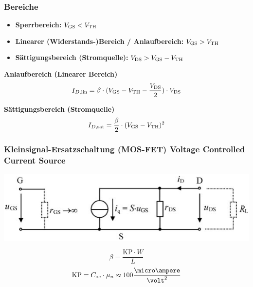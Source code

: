 \subsubsection{Bereiche}

\begin{itemize}
    \item \textbf{Sperrbereich:} $V_{\rm GS} < V_{\rm TH}$ 
    \item \textbf{Linearer (Widerstands-)Bereich / Anlaufbereich:} $V_{\rm GS} > V_{\rm TH}$
    \item \textbf{Sättigungsbereich (Stromquelle):} $V_{\rm DS} > V_{\rm GS} - V_{\rm TH}$
\end{itemize}

\vspace{0.2cm}

\begin{minipage}[t]{0.48\columnwidth}
    \textbf{Anlaufbereich (Linearer Bereich)}
    $$ I_{D,\rm lin} = \beta \cdot ( V_{\rm GS} - V_{\rm TH} - \frac{V_{\rm DS}}{2} ) \cdot V_{\rm DS} $$
\end{minipage}
\hfill
\begin{minipage}[t]{0.48\columnwidth}
    \textbf{Sättigungsbereich (Stromquelle)}
    $$  I_{D,\rm sat} = \frac{\beta}{2} \cdot ( V_{\rm GS} - V_{\rm TH} )^2 $$
\end{minipage}


\subsubsection{Kleinsignal-Ersatzschaltung (MOS-FET) Voltage Controlled Current Source}

\begin{minipage}[t]{0.65\columnwidth}
    \includegraphics[align=t, width=\columnwidth]{images/mos_fet_kleinsignalersatzschaltung.png}
\end{minipage}
\hfill
\begin{minipage}[t]{0.33\columnwidth}
    $$ \beta = \frac{\mathrm{KP} \cdot W}{L} $$
    $$ \mathrm{KP} = C_{\rm oc} \cdot \mu_n \approx 100 \frac{\micro \ampere}{\volt^2} $$  %
\end{minipage}

